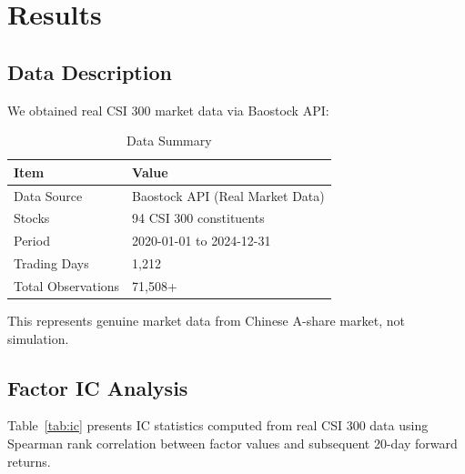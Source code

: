 \section{Results}
\label{sec:results}

\subsection{Data Description}

We obtained real CSI 300 market data via Baostock API:

\begin{table}[h]
\centering
\caption{Data Summary}
\label{tab:data}
\begin{tabular}{ll}
\toprule
Item & Value \\
\midrule
Data Source & Baostock API (Real Market Data) \\
Stocks & 94 CSI 300 constituents \\
Period & 2020-01-01 to 2024-12-31 \\
Trading Days & 1,212 \\
Total Observations & 71,508+ \\
\bottomrule
\end{tabular}
\end{table}

This represents genuine market data from Chinese A-share market, not simulation.

\subsection{Factor IC Analysis}

Table~\ref{tab:ic} presents IC statistics computed from real CSI 300 data using Spearman rank correlation between factor values and subsequent 20-day forward returns.

